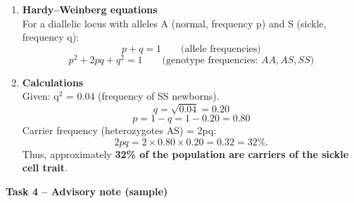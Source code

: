 \documentclass[11pt]{article}
\newcommand{\cle}[1]{{\popxbold\color{popdark}#1}}
\begin{document}
\begin{enumerate}
    \item \textbf{Hardy–Weinberg equations}\\
    For a diallelic locus with alleles \cle{A} (normal, frequency \cle{p}) and \cle{S} (sickle, frequency \cle{q}):
    \[
    p + q = 1 \qquad \text{(allele frequencies)}
    \]
    \[
    p^2 + 2pq + q^2 = 1 \qquad \text{(genotype frequencies: } AA, AS, SS\text{)}
    \]
    \item \textbf{Calculations}\\
    Given: \cle{q$^{2}$ = 0.04} (frequency of \cle{SS} newborns).
    \[
    q = \sqrt{0.04} = 0.20
    \]
    \[
    p = 1 - q = 1 - 0.20 = 0.80
    \]
    Carrier frequency (heterozygotes \cle{AS}) = \cle{2pq}:
    \[
    2pq = 2 \times 0.80 \times 0.20 = 0.32 = 32\%.
    \]
    Thus, approximately \textbf{32\% of the population are carriers of the sickle cell trait}.
\end{enumerate}

\textbf{Task 4 – Advisory note (sample)}
\end{document}
